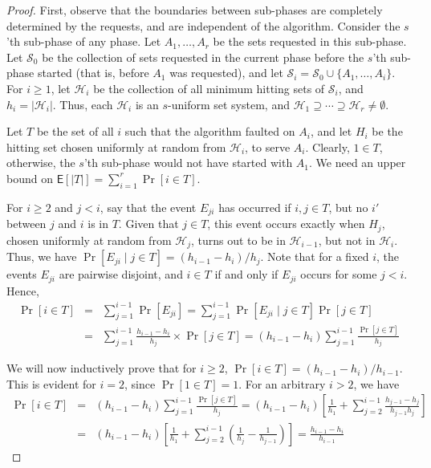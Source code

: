 \documentclass[11pt]{article}
\theoremstyle{plain}\newtheorem{theorem}{Theorem}
\theoremstyle{definition}
\theoremstyle{remark}
\DeclareMathOperator{\suchthat}{\text{ }|\text{ }}
\begin{document}
\begin{proof}
First, observe that the boundaries between sub-phases are completely determined by the requests, and are independent of the algorithm. Consider the $s$'th sub-phase of any phase. Let $A_1,\ldots,A_r$ be the sets requested in this sub-phase. Let $\mathcal{S}_0$ be the collection of sets requested in the current phase before the $s$'th sub-phase started (that is, before $A_1$ was requested), and let $\mathcal{S}_i=\mathcal{S}_0\cup\{A_1,\ldots,A_i\}$. For $i\geq1$, let $\mathcal{H}_i$ be the collection of all minimum hitting sets of $\mathcal{S}_i$, and $h_i=|\mathcal{H}_i|$. Thus, each $\mathcal{H}_i$ is an $s$-uniform set system, and $\mathcal{H}_1\supseteq\cdots\supseteq\mathcal{H}_r\neq\emptyset$.

Let $T$ be the set of all $i$ such that the algorithm faulted on $A_i$, and let $H_i$ be the hitting set chosen uniformly at random from $\mathcal{H}_i$, to serve $A_i$. Clearly, $1\in T$, otherwise, the $s$'th sub-phase would not have started with $A_1$. We need an upper bound on $\mathsf{E}[|T|]=\sum_{i=1}^r\Pr[i\in T]$. 

For $i\geq2$ and $j<i$, say that the event $E_{ji}$ has occurred if $i,j\in T$, but no $i'$ between $j$ and $i$ is in $T$. Given that $j\in T$, this event occurs exactly when $H_j$, chosen uniformly at random from $\mathcal{H}_j$, turns out to be in $\mathcal{H}_{i-1}$, but not in $\mathcal{H}_i$. Thus, we have $\Pr[E_{ji}\suchthat j\in T]=(h_{i-1}-h_i)/h_j$. Note that for a fixed $i$, the events $E_{ji}$ are pairwise disjoint, and $i\in T$ if and only if $E_{ji}$ occurs for some $j<i$. Hence,
\begin{eqnarray*}
\Pr[i\in T] & = & \sum_{j=1}^{i-1}\Pr[E_{ji}]=\sum_{j=1}^{i-1}\Pr[E_{ji}\suchthat j\in T]\Pr[j\in T]\\
 & = & \sum_{j=1}^{i-1}\frac{h_{i-1}-h_i}{h_j}\times\Pr[j\in T]=(h_{i-1}-h_i)\sum_{j=1}^{i-1}\frac{\Pr[j\in T]}{h_j}
\end{eqnarray*}

We will now inductively prove that for $i\geq2$, $\Pr[i\in T]=(h_{i-1}-h_i)/h_{i-1}$. This is evident for $i=2$, since $\Pr[1\in T]=1$. For an arbitrary $i>2$, we have
\begin{eqnarray*}
\Pr[i\in T] & = & (h_{i-1}-h_i)\sum_{j=1}^{i-1}\frac{\Pr[j\in T]}{h_j}=(h_{i-1}-h_i)\left[\frac{1}{h_1}+\sum_{j=2}^{i-1}\frac{h_{j-1}-h_j}{h_{j-1}h_j}\right]\\
 & = & (h_{i-1}-h_i)\left[\frac{1}{h_1}+\sum_{j=2}^{i-1}\left(\frac{1}{h_j}-\frac{1}{h_{j-1}}\right)\right]=\frac{h_{i-1}-h_i}{h_{i-1}}
\end{eqnarray*}


\end{proof}
\end{document}
